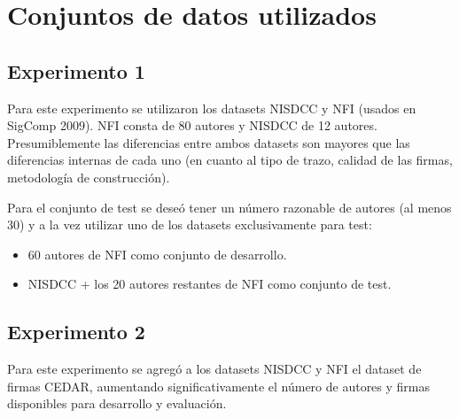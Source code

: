 \section{Conjuntos de datos utilizados}

\subsection{Experimento 1}

Para este experimento se utilizaron los datasets NISDCC y NFI (usados en SigComp 2009). NFI consta de 80 autores y NISDCC de 12 autores. Presumiblemente las diferencias entre ambos datasets son mayores que las diferencias internas de cada uno (en cuanto al tipo de trazo, calidad de las firmas, metodología de construcción).

Para el conjunto de test se deseó tener un número razonable de autores (al menos 30) y a la vez utilizar uno de los datasets exclusivamente para test:
\begin{itemize}
    \item 60 autores de NFI como conjunto de desarrollo.
    \item NISDCC + los 20 autores restantes de NFI como conjunto de test.
\end{itemize}

\subsection{Experimento 2}

Para este experimento se agregó a los datasets NISDCC y NFI el dataset de firmas CEDAR, aumentando significativamente el número de autores y firmas disponibles para desarrollo y evaluación.




